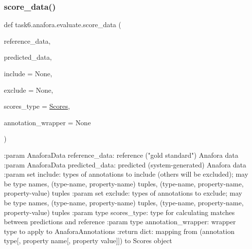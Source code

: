 \subsubsection{\texorpdfstring{score\+\_\+data()}{score\_data()}}
{\footnotesize\ttfamily def task6.\+anafora.\+evaluate.\+score\+\_\+data (\begin{DoxyParamCaption}\item[{}]{reference\+\_\+data,  }\item[{}]{predicted\+\_\+data,  }\item[{}]{include = {\ttfamily None},  }\item[{}]{exclude = {\ttfamily None},  }\item[{}]{scores\+\_\+type = {\ttfamily \hyperlink{classtask6_1_1anafora_1_1evaluate_1_1Scores}{Scores}},  }\item[{}]{annotation\+\_\+wrapper = {\ttfamily None} }\end{DoxyParamCaption})}

\begin{DoxyVerb}:param AnaforaData reference_data: reference ("gold standard") Anafora data
:param AnaforaData predicted_data: predicted (system-generated) Anafora data
:param set include: types of annotations to include (others will be excluded); may be type names,
    (type-name, property-name) tuples, (type-name, property-name, property-value) tuples
:param set exclude: types of annotations to exclude; may be type names, (type-name, property-name) tuples,
    (type-name, property-name, property-value) tuples
:param type scores_type: type for calculating matches between predictions and reference
:param type annotation_wrapper: wrapper type to apply to AnaforaAnnotations
:return dict: mapping from (annotation type[, property name[, property value]]) to Scores object
\end{DoxyVerb}
 \mbox{\label{namespacetask6_1_1anafora_1_1evaluate_ae1fc8e22a0673934451d3e0cb8972f56}} 
